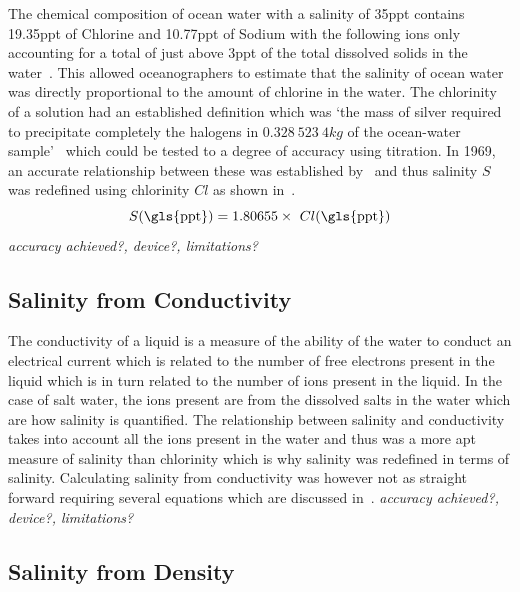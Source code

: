 The chemical composition of ocean water with a salinity of 35\gls{ppt} contains 19.35\gls{ppt} of Chlorine and 10.77\gls{ppt} of Sodium with the following ions only accounting for a total of just above 3\gls{ppt} of the total dissolved solids in the water~\cite{britannica_seawater_encyclopaedia_2024}.
This allowed oceanographers to estimate that the salinity of ocean water was directly proportional to the amount of chlorine in the water.
The chlorinity of a solution had an established definition which was `the mass of silver required to precipitate completely the halogens in $0.328\ 523\ 4 kg$ of the ocean-water sample'~\cite{wooster_redefinition_of_salinity_1969} which could be tested to a degree of accuracy using titration.
In 1969, an accurate relationship between these was established by~ and thus salinity $S$ was redefined using chlorinity $Cl$ as shown in~.
\begin{equation}\label{eq:salinity-chlorinity}
    S (\text{\gls{ppt}}) = 1.80655 \times~Cl (\text{\gls{ppt}})
\end{equation}
\textit{accuracy achieved?, device?, limitations?}

\subsection{Salinity from Conductivity}\label{subsec:salinity-from-conductivity}

The conductivity of a liquid is a measure of the ability of the water to conduct an electrical current which is related to the number of free electrons present in the liquid which is in turn related to the number of ions present in the liquid.
In the case of salt water, the ions present are from the dissolved salts in the water which are how salinity is quantified.
The relationship between salinity and conductivity takes into account all the ions present in the water and thus was a more apt measure of salinity than chlorinity which is why salinity was redefined in terms of salinity.
Calculating salinity from conductivity was however not as straight forward requiring several equations which are discussed in~.
\textit{accuracy achieved?, device?, limitations?}

\subsection{Salinity from Density}

